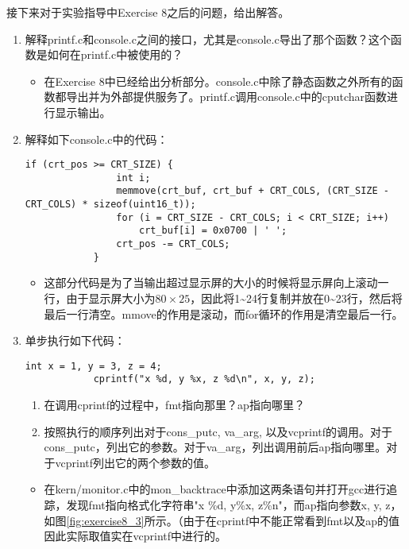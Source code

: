 \par 接下来对于实验指导中Exercise 8之后的问题，给出解答。
\begin{enumerate}
    \item 解释printf.c和console.c之间的接口，尤其是console.c导出了那个函数？这个函数是如何在printf.c中被使用的？
        \begin{itemize}
            \item 在Exercise 8中已经给出分析部分。console.c中除了静态函数之外所有的函数都导出并为外部提供服务了。printf.c调用console.c中的cputchar函数进行显示输出。
        \end{itemize}
    \item 解释如下console.c中的代码：
        \begin{lstlisting}[gobble=12]
            if (crt_pos >= CRT_SIZE) {
                int i;
                memmove(crt_buf, crt_buf + CRT_COLS, (CRT_SIZE - CRT_COLS) * sizeof(uint16_t));
                for (i = CRT_SIZE - CRT_COLS; i < CRT_SIZE; i++)
                    crt_buf[i] = 0x0700 | ' ';
                crt_pos -= CRT_COLS;
            }
        \end{lstlisting}
        \begin{itemize}
            \item 这部分代码是为了当输出超过显示屏的大小的时候将显示屏向上滚动一行，由于显示屏大小为$80\times 25$，因此将1\textasciitilde 24行复制并放在0\textasciitilde 23行，然后将最后一行清空。mmove的作用是滚动，而for循环的作用是清空最后一行。
        \end{itemize}
    \item 单步执行如下代码：
        \begin{lstlisting}[gobble=12]
            int x = 1, y = 3, z = 4;
            cprintf("x %d, y %x, z %d\n", x, y, z);
        \end{lstlisting}
        \begin{enumerate}
            \item 在调用cprintf的过程中，fmt指向那里？ap指向哪里？
            \item 按照执行的顺序列出对于cons\_putc, va\_arg, 以及vcprintf的调用。对于cons\_putc，列出它的参数。对于va\_arg，列出调用前后ap指向哪里。对于vcprintf列出它的两个参数的值。
        \end{enumerate}
        \begin{itemize}
            \item 在kern/monitor.c中的mon\_backtrace中添加这两条语句并打开gcc进行追踪，发现fmt指向格式化字符串"x \%d, y\%x, z\%n"，而ap指向参数x, y, z，如图\ref{fig:exercise8_3}所示。（由于在cprintf中不能正常看到fmt以及ap的值因此实际取值实在vcprintf中进行的。

\end{itemize}
\end{enumerate}
